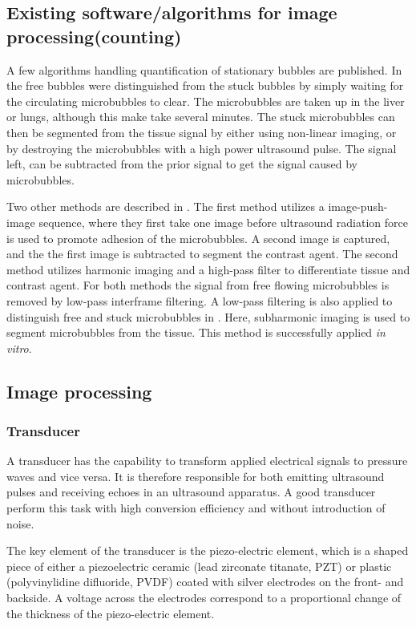 \subsection{Existing software/algorithms for image processing(counting)}
\label{existing algorithms}
A few algorithms handling quantification of stationary bubbles are published. In \cite{Rychak2006} the free bubbles were distinguished from the stuck bubbles by simply waiting for the circulating microbubbles to clear. The microbubbles are taken up in the liver or lungs, although this make take several minutes. The stuck microbubbles can then be segmented from the tissue signal by either using non-linear imaging, or by destroying the microbubbles with a high power ultrasound pulse. The signal left, can be subtracted from the prior signal to get the signal caused by microbubbles.

Two other methods are described in \cite{Zhao2007}. The first method utilizes a image-push-image sequence, where they first take one image before ultrasound radiation force is used to promote adhesion of the microbubbles. A second image is captured, and the the first image is subtracted to segment the contrast agent. The second method utilizes harmonic imaging and a high-pass filter to differentiate tissue and contrast agent. For both methods the signal from free flowing microbubbles is removed by low-pass interframe filtering. A low-pass filtering is also applied to distinguish free and stuck microbubbles in \cite{Needles2009}. Here, subharmonic imaging is used to segment microbubbles from the tissue. This method is successfully applied \textit{in vitro}.  
   
\subsection{Image processing}
\subsubsection{Transducer}
A transducer has the capability to transform applied electrical signals to pressure waves and vice versa. It is therefore responsible for both emitting ultrasound pulses and receiving echoes in an ultrasound apparatus. A good transducer perform this task with high conversion efficiency and without introduction of noise. 

The key element of the transducer is the piezo-electric element, which is a shaped piece of either a piezoelectric ceramic (lead zirconate titanate, PZT) or plastic (polyvinylidine difluoride, PVDF) coated with silver electrodes on the front- and backside. A voltage across the electrodes correspond to a proportional change of the thickness of the piezo-electric element.

